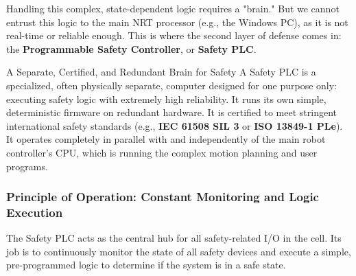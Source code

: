 Handling this complex, state-dependent logic requires a "brain." But we cannot entrust this logic to the main NRT processor (e.g., the Windows PC), as it is not real-time or reliable enough. This is where the second layer of defense comes in: the \textbf{Programmable Safety Controller}, or \textbf{Safety PLC}.

\begin{principlebox}{A Separate, Certified, and Redundant Brain for Safety}
A Safety PLC is a specialized, often physically separate, computer designed for one purpose only: executing safety logic with extremely high reliability. It runs its own simple, deterministic firmware on redundant hardware. It is certified to meet stringent international safety standards (e.g., \textbf{IEC 61508 SIL 3} or \textbf{ISO 13849-1 PLe}). It operates completely in parallel with and independently of the main robot controller's CPU, which is running the complex motion planning and user programs.
\end{principlebox}

\subsubsection{Principle of Operation: Constant Monitoring and Logic Execution}
\label{subsubsec:safety_plc_operation}

The Safety PLC acts as the central hub for all safety-related I/O in the cell. Its job is to continuously monitor the state of all safety devices and execute a simple, pre-programmed logic to determine if the system is in a safe state.

